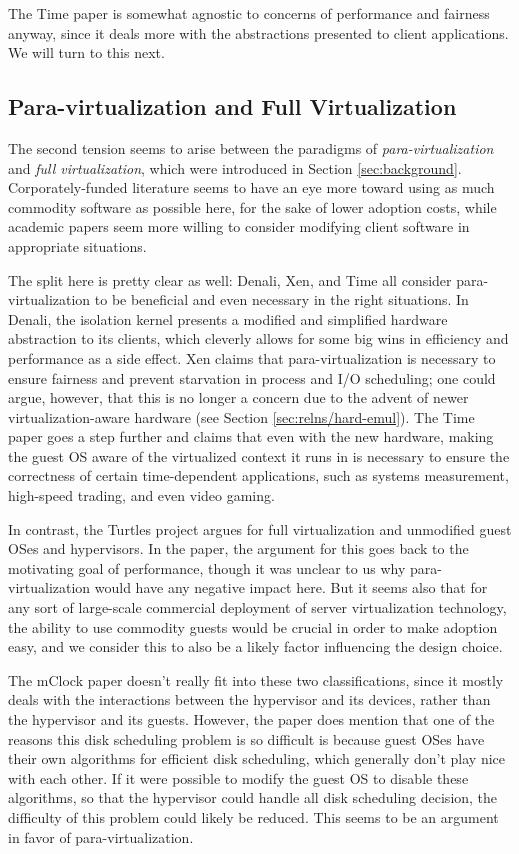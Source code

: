 \documentclass[letterpaper, twocolumn]{article}
\begin{document}
The Time paper is somewhat agnostic to concerns of performance and fairness anyway,
since it deals more with the abstractions presented to client applications.  We
will turn to this next.

\subsection{Para-virtualization and Full Virtualization}
\label{sec:relns/para-full}

The second tension seems to arise between the paradigms of \emph{para-virtualization}
and \emph{full virtualization}, which were introduced in Section \ref{sec:background}.
Corporately-funded literature seems to have an eye more toward using as much
commodity software as possible here, for the sake of lower adoption costs, while
academic papers seem more willing to consider modifying client software in
appropriate situations.

The split here is pretty clear as well: Denali, Xen, and Time all consider
para-virtualization to be beneficial and even necessary in the right situations.
In Denali, the isolation kernel presents a modified and simplified hardware abstraction
to its clients, which cleverly allows for some big wins in efficiency and performance
as a side effect.  Xen claims that para-virtualization is necessary to ensure fairness
and prevent starvation in process and I/O scheduling; one could argue, however, that
this is no longer a concern due to the advent of newer virtualization-aware hardware
(see Section \ref{sec:relns/hard-emul}).  The Time paper goes a step further and claims that
even with the new hardware, making the guest OS aware of the virtualized context it
runs in is necessary to ensure the correctness of certain time-dependent applications,
such as systems measurement, high-speed trading, and even video gaming.

In contrast, the Turtles project argues for full virtualization and unmodified guest
OSes and hypervisors.  In the paper, the argument for this goes back to the
motivating goal of performance, though it was unclear to us why para-virtualization
would have any negative impact here.  But it seems also that for any sort of large-scale
commercial deployment of server virtualization technology, the ability to use commodity
guests would be crucial in order to make adoption easy, and we consider this to also
be a likely factor influencing the design choice.

The mClock paper doesn't really fit into these two classifications, since it mostly
deals with the interactions between the hypervisor and its devices, rather than the hypervisor
and its guests.  However, the paper does mention that one of the reasons this disk
scheduling problem is so difficult is because guest OSes have their own algorithms
for efficient disk scheduling, which generally don't play nice with each other.  If it
were possible to modify the guest OS to disable these algorithms, so that the hypervisor
could handle all disk scheduling decision, the difficulty of this problem could likely
be reduced.  This seems to be an argument in favor of para-virtualization.
\end{document}
